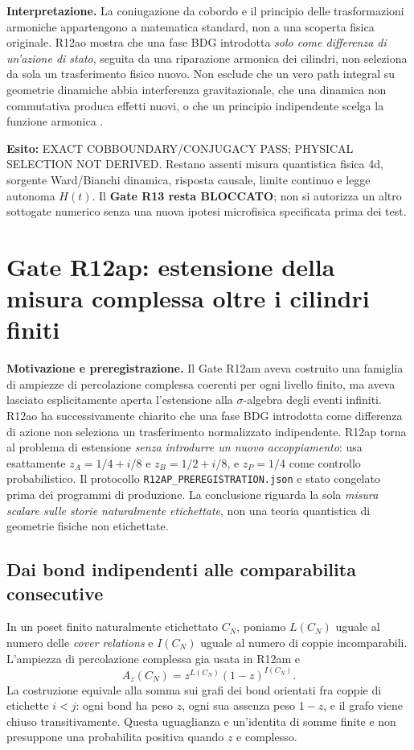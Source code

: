 \documentclass[11pt,a4paper]{article}
\begin{document}
\textbf{Interpretazione.} La coniugazione da cobordo e il principio delle trasformazioni armoniche appartengono a matematica standard, non a una scoperta fisica originale. R12ao mostra che una fase BDG introdotta \emph{solo come differenza di un'azione di stato}, seguita da una riparazione armonica dei cilindri, non seleziona da sola un trasferimento fisico nuovo. Non esclude che un vero path integral su geometrie dinamiche abbia interferenza gravitazionale, che una dinamica non commutativa produca effetti nuovi, o che un principio indipendente scelga la funzione armonica \cite{SuryaZalel2020,SrivastavaSurya2026}.

\textbf{Esito:} \textsf{EXACT COBBOUNDARY/CONJUGACY PASS; PHYSICAL SELECTION NOT DERIVED}. Restano assenti misura quantistica fisica 4d, sorgente Ward/Bianchi dinamica, risposta causale, limite continuo e legge autonoma $H(t)$. Il \textbf{Gate R13 resta BLOCCATO}; non si autorizza un altro sottogate numerico senza una nuova ipotesi microfisica specificata prima dei test.

\section{Gate R12ap: estensione della misura complessa oltre i cilindri finiti}

\textbf{Motivazione e preregistrazione.} Il Gate R12am aveva costruito una famiglia di ampiezze di percolazione complessa coerenti per ogni livello finito, ma aveva lasciato esplicitamente aperta l'estensione alla $\sigma$-algebra degli eventi infiniti. R12ao ha successivamente chiarito che una fase BDG introdotta come differenza di azione non seleziona un trasferimento normalizzato indipendente. R12ap torna al problema di estensione \emph{senza introdurre un nuovo accoppiamento}: usa esattamente $z_A=1/4+i/8$ e $z_B=1/2+i/8$, e $z_P=1/4$ come controllo probabilistico. Il protocollo \texttt{R12AP\_PREREGISTRATION.json} e stato congelato prima dei programmi di produzione. La conclusione riguarda la sola \emph{misura scalare sulle storie naturalmente etichettate}, non una teoria quantistica di geometrie fisiche non etichettate.

\subsection{Dai bond indipendenti alle comparabilita consecutive}

In un poset finito naturalmente etichettato $C_N$, poniamo $L(C_N)$ uguale al numero delle \emph{cover relations} e $I(C_N)$ uguale al numero di coppie incomparabili. L'ampiezza di percolazione complessa gia usata in R12am e
\begin{equation}
 A_z(C_N)=z^{L(C_N)}(1-z)^{I(C_N)}.
 \label{eq:r12ap_amplitude}
\end{equation}
La costruzione equivale alla somma sui grafi dei bond orientati fra coppie di etichette $i<j$: ogni bond ha peso $z$, ogni sua assenza peso $1-z$, e il grafo viene chiuso transitivamente. Questa uguaglianza e un'identita di somme finite e non presuppone una probabilita positiva quando $z$ e complesso.
\end{document}
